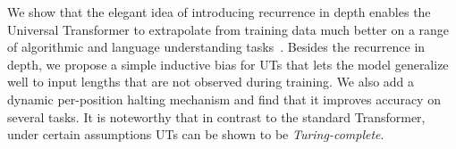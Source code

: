 We show that the elegant idea of introducing recurrence in depth enables the Universal Transformer to extrapolate from training data much better on a range of algorithmic and language understanding tasks~\cite{Dehghani:ICLR:2019, Dehghani:2019:WSDM}.
Besides the recurrence in depth, we propose a simple inductive bias for UTs that lets the model generalize well to input lengths that are not observed during training.  We also add a dynamic per-position halting mechanism and find that it improves accuracy on several tasks.  It is noteworthy that in contrast to the standard Transformer, under certain assumptions UTs can be shown to be \emph{Turing-complete}. 

